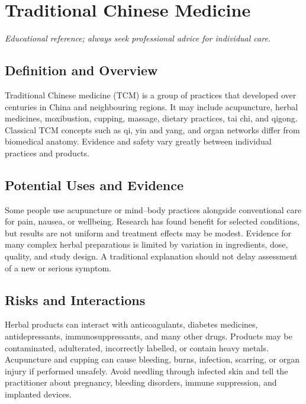 \chapter{Traditional Chinese Medicine}
\medskip
\noindent\textit{Educational reference; always seek professional advice for individual care.}

\section*{Definition and Overview}
Traditional Chinese medicine (TCM) is a group of practices that developed over centuries in China and neighbouring regions. It may include acupuncture, herbal medicines, moxibustion, cupping, massage, dietary practices, tai chi, and qigong. Classical TCM concepts such as qi, yin and yang, and organ networks differ from biomedical anatomy. Evidence and safety vary greatly between individual practices and products.

\section*{Potential Uses and Evidence}
Some people use acupuncture or mind--body practices alongside conventional care for pain, nausea, or wellbeing. Research has found benefit for selected conditions, but results are not uniform and treatment effects may be modest. Evidence for many complex herbal preparations is limited by variation in ingredients, dose, quality, and study design. A traditional explanation should not delay assessment of a new or serious symptom.

\section*{Risks and Interactions}
Herbal products can interact with anticoagulants, diabetes medicines, antidepressants, immunosuppressants, and many other drugs. Products may be contaminated, adulterated, incorrectly labelled, or contain heavy metals. Acupuncture and cupping can cause bleeding, burns, infection, scarring, or organ injury if performed unsafely. Avoid needling through infected skin and tell the practitioner about pregnancy, bleeding disorders, immune suppression, and implanted devices.

